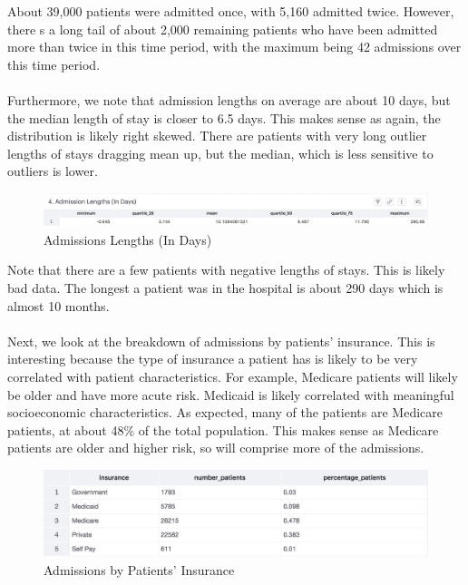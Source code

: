 \documentclass[12pt, final]{article}
\begin{document}
About 39,000 patients were admitted once, with 5,160 admitted twice. However, there s a long tail of about 2,000 remaining patients who have been admitted more than twice in this time period, with the maximum being 42 admissions over this time period.
\\
\\
Furthermore, we note that admission lengths on average are about 10 days, but the median length of stay is closer to 6.5 days. This makes sense as again, the distribution is likely right skewed. There are patients with very long outlier lengths of stays dragging mean up, but the median, which is less sensitive to outliers is lower.

\begin{figure}[H]
\centering
\caption{Admissions Lengths (In Days)}
\label{AdmissionsLengths}
\includegraphics[page = {1}, scale = 0.4]{./images/admissions-lengths.png}
\end{figure}

Note that there are a few patients with negative lengths of stays. This is likely bad data. The longest a patient was in the hospital is about 290 days which is almost 10 months.
\\
\\
Next, we look at the breakdown of admissions by patients' insurance. This is interesting because the type of insurance a patient has is likely to be very correlated with patient characteristics. For example, Medicare patients will likely be older and have more acute risk. Medicaid is likely correlated with meaningful socioeconomic characteristics. As expected, many of the patients are Medicare patients, at about 48\% of the total population. This makes sense as Medicare patients are older and higher risk, so will comprise more of the admissions.

\begin{figure}[H]
\centering
\caption{Admissions by Patients' Insurance}
\label{AdmissionsByInsurance}
\includegraphics[page = {1}, scale = 0.4]{./images/admissions-insurance-summary.png}
\end{figure}
\end{document}
